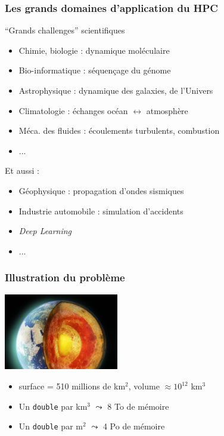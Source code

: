 \documentclass[xcolor={x11names,svgnames}]{beamer}
\begin{document}
\begin{frame}
\frametitle{Les grands domaines d'application du HPC}


\begin{block}{``Grands challenges'' scientifiques}
  \begin{itemize}
  \item Chimie, biologie : dynamique moléculaire 
  \item Bio-informatique : séquençage du génome
  \item Astrophysique : dynamique des  galaxies, de l'Univers  
  \item Climatologie : échanges océan $\leftrightarrow$ atmosphère
  \item Méca. des fluides : écoulements turbulents, combustion
  \item ...
  \end{itemize}
\end{block}

Et aussi : 
\begin{itemize}
\item Géophysique : propagation d'ondes sismiques
\item Industrie automobile : simulation d'accidents 
\item \og \textit{Deep Learning}\fg
\item ... 
\end{itemize}
\end{frame}


\begin{frame}
\frametitle{Illustration du problème}

\begin{center}
\includegraphics[width=5cm]{earth-core.jpg}
\end{center}

\begin{itemize}
\item surface = 510 millions de km${^2}$, volume $\approx 10^{12}$ km${}^3$
  \medskip
\item Un \texttt{double} par km${}^3$ $\leadsto$ 8 To de mémoire

\item Un \texttt{double} par m${}^2$ $\leadsto$ 4 Po de mémoire
\end{itemize}

\end{frame}
\end{document}
